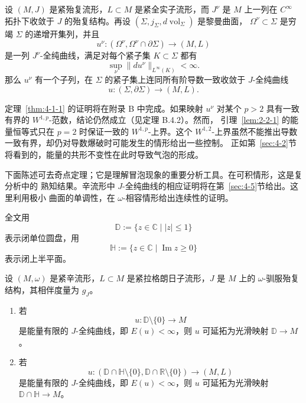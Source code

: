\begin{theorem}\label{thm:4-1-1}
设 $(M,J)$ 是紧殆复流形，$L\subset M$ 是紧全实子流形，而 $J^\nu$ 是 $M$ 上一列在
$C^\infty$ 拓扑下收敛于 $J$ 的殆复结构。再设
$(\Sigma,j_\Sigma,d\operatorname{vol}_\Sigma)$ 是黎曼曲面，
$\Omega^\nu\subset\Sigma$ 是穷竭 $\Sigma$ 的递增开集列，并且
\[
  u^\nu:(\Omega^\nu,\Omega^\nu\cap\partial\Sigma)\longrightarrow(M,L)
\]
是一列 $J^\nu$-全纯曲线，满足对每个紧子集 $K\subset\Sigma$ 都有
\[
  \sup_\nu\|du^\nu\|_{L^\infty(K)}<\infty.
\]
那么 $u^\nu$ 有一个子列，在 $\Sigma$ 的紧子集上连同所有阶导数一致收敛于
$J$-全纯曲线
\[
  u:(\Sigma,\partial\Sigma)\longrightarrow(M,L).
\]
\end{theorem}

定理~\ref{thm:4-1-1} 的证明将在附录 B 中完成。如果映射 $u^\nu$ 对某个 $p>2$
具有一致有界的 $W^{1,p}$-范数，结论仍然成立（见定理 B.4.2）。然而，
引理~\ref{lem:2-2-1} 的能量恒等式只在 $p=2$ 时保证一致的 $W^{1,p}$-上界。这个
$W^{1,2}$-上界虽然不能推出导数一致有界，却仍对导数爆破时可能发生的情形给出一些控制。
正如第~\ref{sec:4-2}节将看到的，能量的共形不变性在此时导致气泡的形成。

下面陈述可去奇点定理；它是理解冒泡现象的重要分析工具。在可积情形，这是复分析中的
熟知结果。辛流形中 $J$-全纯曲线的相应证明将在第~\ref{sec:4-5}节给出。这里利用极小
曲面的单调性，在 $\omega$-相容情形给出连续性的证明。

全文用
\[
  \mathbb D:=\{z\in\mathbb C\mid |z|\le1\}
\]
表示闭单位圆盘，用
\[
  \mathbb H:=\{z\in\mathbb C\mid \operatorname{Im}z\ge0\}
\]
表示闭上半平面。

\begin{theorem}[可去奇点]\label{thm:4-1-2}
设 $(M,\omega)$ 是紧辛流形，$L\subset M$ 是紧拉格朗日子流形，$J$ 是 $M$ 上的
$\omega$-驯服殆复结构，其相伴度量为 $g_J$。
\begin{enumerate}[label=\textup{(\roman*)},leftmargin=3em]
\item 若
\[
  u:\mathbb D\setminus\{0\}\longrightarrow M
\]
是能量有限的 $J$-全纯曲线，即 $E(u)<\infty$，则 $u$ 可延拓为光滑映射
$\mathbb D\to M$。
\item 若
\[
  u:
  (\mathbb D\cap\mathbb H\setminus\{0\},
   \mathbb D\cap\mathbb R\setminus\{0\})
  \longrightarrow(M,L)
\]
是能量有限的 $J$-全纯曲线，即 $E(u)<\infty$，则 $u$ 可延拓为光滑映射
$\mathbb D\cap\mathbb H\to M$。
\end{enumerate}
\end{theorem}


